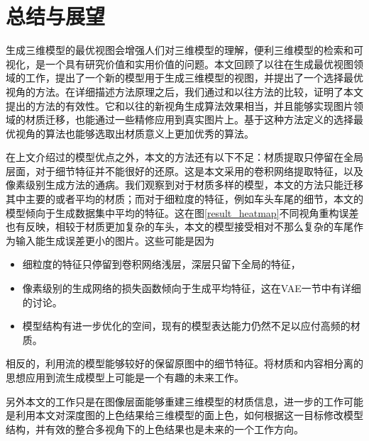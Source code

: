 \documentclass[UTF8,openany,AutoFakeBold,AutoFakeSlant,cs4size]{ctexbook}
\begin{document}
\clearpage

\chapter{总结与展望}

生成三维模型的最优视图会增强人们对三维模型的理解，便利三维模型的检索和可视化，是一个具有研究价值和实用价值的问题。本文回顾了以往在生成最优视图领域的工作，提出了一个新的模型用于生成三维模型的视图，并提出了一个选择最优视角的方法。在详细描述方法原理之后，我们通过和以往方法的比较，证明了本文提出的方法的有效性。它和以往的新视角生成算法效果相当，并且能够实现图片领域的材质迁移，也能通过一些精修应用到真实图片上。基于这种方法定义的选择最优视角的算法也能够选取出材质意义上更加优秀的算法。

在上文介绍过的模型优点之外，本文的方法还有以下不足：材质提取只停留在全局层面，对于细节特征并不能很好的还原。这是本文采用的卷积网络提取特征，以及像素级别生成方法的通病。我们观察到对于材质多样的模型，本文的方法只能迁移其中主要的或者平均的材质；而对于细粒度的特征，例如车头车尾的细节，本文的模型倾向于生成数据集中平均的特征。这在图\ref{result_heatmap}不同视角重构误差也有反映，相较于材质更加复杂的车头，本文的模型接受相对不那么复杂的车尾作为输入能生成误差更小的图片。这些可能是因为
\begin{itemize}
	\item 细粒度的特征只停留到卷积网络浅层，深层只留下全局的特征，
	\item 像素级别的生成网络的损失函数倾向于生成平均特征，这在VAE一节中有详细的讨论。
	\item 模型结构有进一步优化的空间，现有的模型表达能力仍然不足以应付高频的材质。
\end{itemize}
相反的，利用流的模型能够较好的保留原图中的细节特征。将材质和内容相分离的思想应用到流生成模型上可能是一个有趣的未来工作。

另外本文的工作只是在图像层面能够重建三维模型的材质信息，进一步的工作可能是利用本文对深度图的上色结果给三维模型的面上色，如何根据这一目标修改模型结构，并有效的整合多视角下的上色结果也是未来的一个工作方向。





\clearpage


{
	\fancyhf{}
	\fancyfoot[CO,CE]{~\thepage~}
	\renewcommand{\headrulewidth}{0.7pt}
	\renewcommand{\footrulewidth}{0pt}
}
\fancyhf{}
\fancyfoot[CO,CE]{~\thepage~}
\renewcommand{\headrulewidth}{0.7pt}
\renewcommand{\footrulewidth}{0pt}
\end{document}
